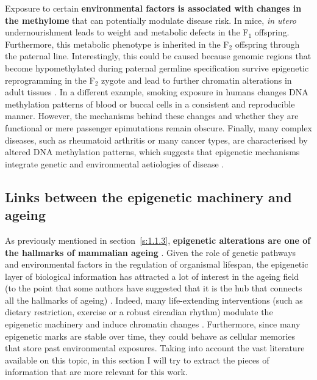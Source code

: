 \bigskip

Exposure to certain \textbf{environmental factors is associated with changes in the methylome} that can potentially modulate disease risk. In mice, \textit{in utero} undernourishment leads to weight and metabolic defects in the F$_1$ offspring. Furthermore, this metabolic phenotype is inherited in the F$_2$ offspring through the paternal line. Interestingly, this could be caused because genomic regions that become hypomethylated during paternal germline specification survive epigenetic reprogramming in the F$_2$ zygote and lead to further chromatin alterations in adult tissues \cite{Radford2014}. In a different example, smoking exposure in humans changes DNA methylation patterns of blood \cite{Roby2016} or buccal cells \cite{Teschendorff2015} in a consistent and reproducible manner. However, the mechanisms behind these changes and whether they are functional or mere passenger epimutations remain obscure. Finally, many complex diseases, such as rheumatoid arthritis or many cancer types, are characterised by altered DNA methylation patterns, which suggests that epigenetic mechanisms integrate genetic and environmental aetiologies of disease \cite{Liu2013,Widschwendter2018}.

\smallskip

\subsection{Links between the epigenetic machinery and ageing} \label{s:1.2.3}

\smallskip

As previously mentioned in section~\ref{s:1.1.3}, \textbf{epigenetic alterations are one of the hallmarks of mammalian ageing} \cite{Lopez-Otin2013}. Given the role of genetic pathways and environmental factors in the regulation of organismal lifespan, the epigenetic layer of biological information has attracted a lot of interest in the ageing field (to the point that some authors have suggested that it is the hub that connects all the hallmarks of ageing) \cite{Booth2016}. Indeed, many life-extending interventions (such as dietary restriction, exercise or a robust circadian rhythm) modulate the epigenetic machinery and induce chromatin changes \cite{Benayoun2015a}. Furthermore, since many epigenetic marks are stable over time, they could behave as cellular memories that store past environmental exposures. Taking into account the vast literature available on this topic, in this section I will try to extract the pieces of information that are more relevant for this work.

